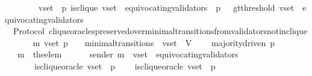 \begin{isabellebody}
\ \ \ \ \ \ \ {\isacharequal}\ {\isacharparenleft}{\isasymlambda}{\isacharparenleft}v{\isacharunderscore}set{\isacharcomma}\ {\isasymsigma}{\isacharcomma}\ p{\isacharparenright}{\isachardot}\ {\isacharparenleft}is{\isacharunderscore}clique\ {\isacharparenleft}v{\isacharunderscore}set\ {\isacharminus}\ {\isacharparenleft}equivocating{\isacharunderscore}validators\ {\isasymsigma}{\isacharparenright}{\isacharcomma}\ p{\isacharcomma}\ {\isasymsigma}{\isacharparenright}\ {\isasymand}\ gt{\isacharunderscore}threshold\ {\isacharparenleft}v{\isacharunderscore}set\ {\isacharminus}\ {\isacharparenleft}equivocating{\isacharunderscore}validators\ {\isasymsigma}{\isacharparenright}{\isacharcomma}\ {\isasymsigma}{\isacharparenright}{\isacharparenright}{\isacharparenright}{\isachardoublequoteclose}\isanewline
\isanewline
\isanewline
{}\isamarkupfalse%
\ {\isacharparenleft}\ Protocol{\isacharparenright}\ clique{\isacharunderscore}oracles{\isacharunderscore}preserved{\isacharunderscore}over{\isacharunderscore}minimal{\isacharunderscore}transitions{\isacharunderscore}from{\isacharunderscore}validators{\isacharunderscore}not{\isacharunderscore}in{\isacharunderscore}clique\ {\isacharcolon}\isanewline
\ \ {\isachardoublequoteopen}{\isasymforall}\ {\isasymsigma}\ {\isasymsigma}{\isacharprime}\ m{\isacharprime}\ v{\isacharunderscore}set\ p{\isachardot}\ {\isacharparenleft}{\isasymsigma}{\isacharcomma}\ {\isasymsigma}{\isacharprime}{\isacharparenright}\ {\isasymin}\ minimal{\isacharunderscore}transitions\ {\isasymand}\ v{\isacharunderscore}set\ {\isasymsubseteq}\ V\ \isanewline
\ \ {\isasymlongrightarrow}\ majority{\isacharunderscore}driven\ p\isanewline
\ \ {\isasymlongrightarrow}\ m{\isacharprime}\ {\isacharequal}\ the{\isacharunderscore}elem\ {\isacharparenleft}{\isasymsigma}{\isacharprime}\ {\isacharminus}\ {\isasymsigma}{\isacharparenright}\isanewline
\ \ {\isasymlongrightarrow}\ sender\ m{\isacharprime}\ {\isasymnotin}\ v{\isacharunderscore}set\ {\isacharminus}\ equivocating{\isacharunderscore}validators\ {\isasymsigma}\isanewline
\ \ \ \ \ \ {\isasymand}\ is{\isacharunderscore}clique{\isacharunderscore}oracle\ {\isacharparenleft}v{\isacharunderscore}set{\isacharcomma}\ {\isasymsigma}{\isacharcomma}\ p{\isacharparenright}\ \isanewline
\ \ {\isasymlongrightarrow}\ is{\isacharunderscore}clique{\isacharunderscore}oracle\ {\isacharparenleft}v{\isacharunderscore}set{\isacharcomma}\ {\isasymsigma}{\isacharprime}{\isacharcomma}\ p{\isacharparenright}{\isachardoublequoteclose}\isanewline
%
\isadelimproof
\ \ %
\endisadelimproof
%
\isatagproof
{}\isamarkupfalse%

\end{isabellebody}
